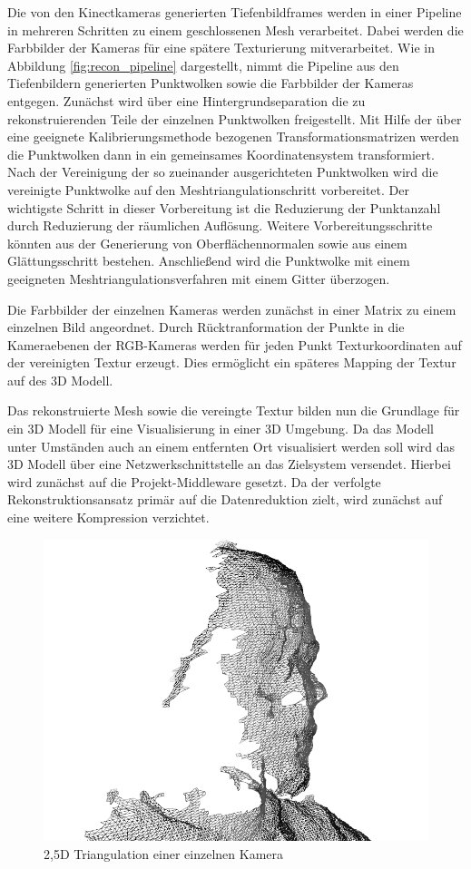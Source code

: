 Die von den Kinectkameras generierten Tiefenbildframes werden in einer Pipeline 
in mehreren Schritten zu einem geschlossenen Mesh verarbeitet. Dabei werden die
Farbbilder der Kameras für eine spätere Texturierung mitverarbeitet. Wie in 
Abbildung \ref{fig:recon_pipeline} dargestellt, nimmt die Pipeline aus den 
Tiefenbildern generierten Punktwolken sowie die Farbbilder der Kameras entgegen.
Zunächst wird über eine Hintergrundseparation die zu rekonstruierenden Teile der 
einzelnen Punktwolken freigestellt. Mit Hilfe der über eine geeignete 
Kalibrierungsmethode bezogenen Transformationsmatrizen werden die Punktwolken 
dann in ein gemeinsames Koordinatensystem transformiert. Nach der Vereinigung 
der so zueinander ausgerichteten Punktwolken wird die vereinigte Punktwolke auf 
den Meshtriangulationschritt vorbereitet. Der wichtigste Schritt in dieser 
Vorbereitung ist die Reduzierung der Punktanzahl durch Reduzierung der räumlichen 
Auflösung. Weitere Vorbereitungsschritte könnten aus der Generierung von 
Oberflächennormalen sowie aus einem Glättungsschritt bestehen. Anschließend wird 
die Punktwolke mit einem geeigneten Meshtriangulationsverfahren mit einem Gitter 
überzogen.

Die Farbbilder der einzelnen Kameras werden zunächst in einer Matrix zu einem 
einzelnen Bild angeordnet. Durch Rücktranformation der Punkte in die 
Kameraebenen der RGB-Kameras werden für jeden Punkt Texturkoordinaten auf der 
vereinigten Textur erzeugt. Dies ermöglicht ein späteres Mapping der Textur auf 
des 3D Modell.

Das rekonstruierte Mesh sowie die vereingte Textur bilden nun die Grundlage für 
ein 3D Modell für eine Visualisierung in einer 3D Umgebung. Da das Modell unter 
Umständen auch an einem entfernten Ort visualisiert werden soll wird das 3D 
Modell über eine Netzwerkschnittstelle an das Zielsystem versendet. Hierbei wird 
zunächst auf die Projekt-Middleware gesetzt. Da der verfolgte Rekonstruktionsansatz 
primär auf die Datenreduktion zielt, wird zunächst auf eine weitere Kompression verzichtet.

\begin{figure}[H]
	\centering
	\includegraphics[width=.5\textwidth]{figs/recon_wireframe}
	\caption{2,5D Triangulation einer einzelnen Kamera}
	\label{fig:2dmeshed}
\end{figure}

